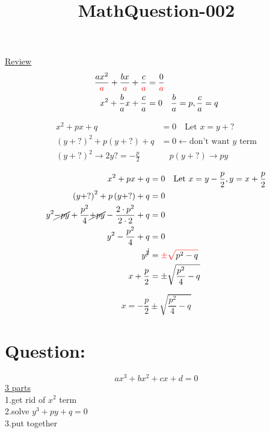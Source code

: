 \documentclass[A4]{ctexart}
\title{MathQuestion-002}
\date{}
\begin{document}
	\maketitle
	\underline{Review}\\
	\begin{align*}
		\frac{ax^2}{\color{red}a}+\frac{bx}{\color{red}a}+\frac{c}{\color{red}a}&=\frac 0{\color{red}a}\\
		x^2+\frac bax+\frac ca&=0\quad\frac ba=p,\frac ca=q
	\end{align*}
	\begin{tcolorbox}[colback=white,colframe=teal]
		\begin{align*}
			x^2+px+q&=0\quad\text{Let }x=y+?\\
			\left(y+?\right)^2+p\left(y+?\right)+q&=0\leftarrow \text{don't want }y\text{ term}\\
			\left(y+?\right)^2\to2y\boxed{?=-\frac p2}&\quad p\left(y+?\right)\to py
		\end{align*}
	\end{tcolorbox}
	\begin{align*}
		x^2+px+q&=0\quad\text{Let }x=y-\frac p2,y=x+\frac p2\\
		\left(y+?\right)^2+p\left(y+?\right)+q&=0\\
		y^2\cancel{-py}+\frac{p^2}4\cancel{+py}-\frac{2\cdot p^2}{2\cdot2}+q&=0\\
		y^2-\frac{p^2}4+q&=0\\
		y^{\cancel{2}}&={\color{red}\pm\sqrt{\color{black}p^2-q}}\\
		x+\frac p2&=\pm\sqrt{\frac{p^2}4-q}
	\end{align*}
	\begin{tcolorbox}[colback=white,colframe=blue]
			\[x=-\frac p2\pm\sqrt{\frac{p^2}4-q}\]
	\end{tcolorbox}
	\newpage
	\section{Question:}
	\[ax^3+bx^2+cx+d=0\]
	\underline{3 parts}\\
	1.get rid of $x^2$ term\\
	2.solve $y^3+py+q=0$\\
	3.put together
\end{document}
